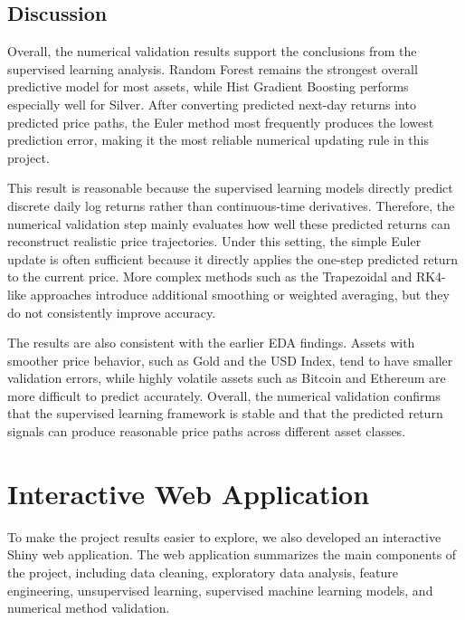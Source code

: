 \documentclass[12pt]{article}
\begin{document}
\subsection{Discussion}

Overall, the numerical validation results support the conclusions from the supervised learning analysis. Random Forest remains the strongest overall predictive model for most assets, while Hist Gradient Boosting performs especially well for Silver. After converting predicted next-day returns into predicted price paths, the Euler method most frequently produces the lowest prediction error, making it the most reliable numerical updating rule in this project.

This result is reasonable because the supervised learning models directly predict discrete daily log returns rather than continuous-time derivatives. Therefore, the numerical validation step mainly evaluates how well these predicted returns can reconstruct realistic price trajectories. Under this setting, the simple Euler update is often sufficient because it directly applies the one-step predicted return to the current price. More complex methods such as the Trapezoidal and RK4-like approaches introduce additional smoothing or weighted averaging, but they do not consistently improve accuracy.

The results are also consistent with the earlier EDA findings. Assets with smoother price behavior, such as Gold and the USD Index, tend to have smaller validation errors, while highly volatile assets such as Bitcoin and Ethereum are more difficult to predict accurately. Overall, the numerical validation confirms that the supervised learning framework is stable and that the predicted return signals can produce reasonable price paths across different asset classes.


\section{Interactive Web Application}

To make the project results easier to explore, we also developed an interactive Shiny web application. The web application summarizes the main components of the project, including data cleaning, exploratory data analysis, feature engineering, unsupervised learning, supervised machine learning models, and numerical method validation.
\end{document}
